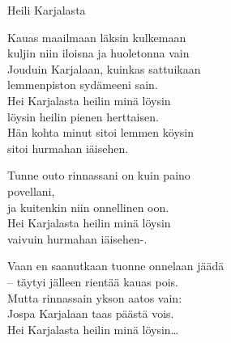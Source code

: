 \begin{song}{Heili Karjalasta}

    Kauas maailmaan läksin kulkemaan\\
    kuljin niin iloisna ja huoletonna vain\\
    Jouduin Karjalaan, kuinkas sattuikaan\\
    lemmenpiston sydämeeni sain.\\
    Hei Karjalasta heilin minä löysin\\
    löysin heilin pienen herttaisen.\\
    Hän kohta minut sitoi lemmen köysin\\
    sitoi hurmahan iäisehen.

    Tunne outo rinnassani on kuin paino\\
    povellani,\\
    ja kuitenkin niin onnellinen oon.\\
    Hei Karjalasta heilin minä löysin\\
    vaivuin hurmahan iäisehen-.

    Vaan en saanutkaan tuonne onnelaan jäädä\\
    – täytyi jälleen rientää kauas pois.\\
    Mutta rinnassain ykson aatos vain:\\
    Jospa Karjalaan taas päästä vois.\\
    Hei Karjalasta heilin minä löysin\dots

\end{song}